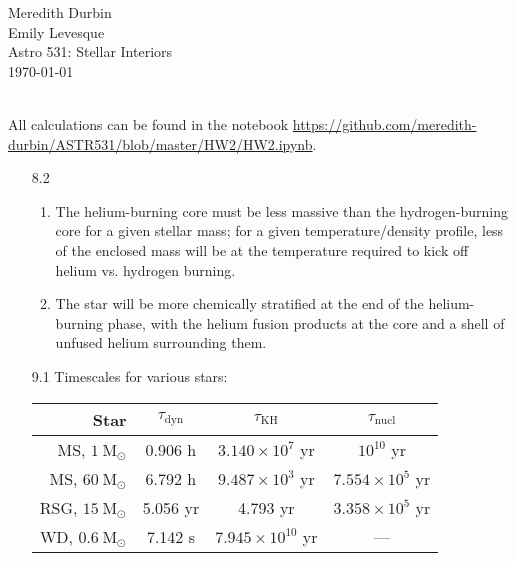\documentclass[11pt]{article}
\newcommand\msol{\mathrm{M}_\odot}
\begin{document}
\begin{flushright}Meredith Durbin\\
Emily Levesque\\
Astro 531: Stellar Interiors\\
\today\\

\end{flushright}

 \\[6pt]

All calculations can be found in the notebook \url{https://github.com/meredith-durbin/ASTR531/blob/master/HW2/HW2.ipynb}.

\begin{enumerate}

\item [8.2]
	\begin{enumerate}
	
    \item The helium-burning core must be less massive than the hydrogen-burning core for a given stellar mass; for a given temperature/density profile, less of the enclosed mass will be at the temperature required to kick off helium vs. hydrogen burning.
    
    \item The star will be more chemically stratified at the end of the helium-burning phase, with the helium fusion products at the core and a shell of unfused helium surrounding them.
    
    \end{enumerate}

\item [9.1] Timescales for various stars:

    \begin{table}[H]
    \centering
    \begin{tabular}{ r | c | c | c }
      Star & $\tau_\mathrm{dyn}$ & $\tau_\mathrm{KH}$ & $\tau_\mathrm{nucl}$ \\ \hline
      MS, $1~\msol$ & 0.906 h & $3.140\times10^7$ yr & $10^{10}$ yr  \\
      MS, $60~\msol$ & 6.792 h & $9.487\times10^3$ yr & $7.554\times10^{5}$ yr  \\
      RSG, $15~\msol$ & 5.056 yr & 4.793 yr & $3.358\times10^{5}$ yr   \\
      WD, $0.6~\msol$ & 7.142 s & $7.945\times10^{10}$ yr & ---  \\
    \end{tabular}
    \end{table}
    

\end{enumerate}
\end{document}
